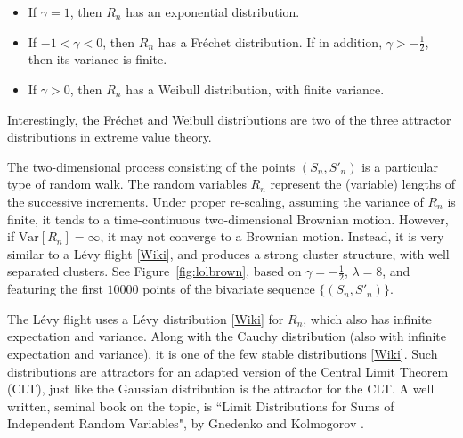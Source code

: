 \documentclass[oneside,10pt]{book}
\begin{document}
\begin{itemize}
\item If $\gamma=1$, then $R_n$ has an exponential distribution.
\item If $-1<\gamma<0$, then $R_n$ has a \textcolor{index}{Fréchet distribution}. If in addition, $\gamma>-\frac{1}{2}$, then its variance is finite. 
\item If $\gamma>0$, then $R_n$ has a \textcolor{index}{Weibull distribution}, with finite variance. 
\end{itemize}
Interestingly, the Fréchet and Weibull distributions are two of the three 
\textcolor{index}{attractor distributions} in \textcolor{index}{extreme value theory}.  

The two-dimensional process consisting of the points $(S_n,S'_n)$ is a particular type of random walk. The random variables $R_n$ represent the (variable) lengths of the successive increments. Under proper re-scaling, assuming the variance of $R_n$ is finite, it tends to a time-continuous
two-dimensional Brownian motion. However, if $\mbox{Var}[R_n]=\infty$, it may not converge to a Brownian motion. Instead, it is very similar to a 
\textcolor{index}{Lévy flight} [\href{https://en.wikipedia.org/wiki/L\%C3\%A9vy_flight}{Wiki}], and produces a strong cluster structure, with well separated clusters. See Figure~\ref{fig:lolbrown}, based on $\gamma=-\frac{1}{2}$, $\lambda=8$, and featuring the first $\num{10000}$ points
 of the bivariate sequence $\{(S_n,S'_n)\}$. 

The 
Lévy flight uses a \textcolor{index}{Lévy distribution}
[\href{https://bit.ly/3rV7mrq}{Wiki}] for $R_n$, which also has infinite expectation and variance. Along with 
the \textcolor{index}{Cauchy distribution} (also with infinite expectation and variance), it is one of the few \textcolor{index}{stable distributions} [\href{https://en.wikipedia.org/wiki/Stable_distribution}{Wiki}]. Such distributions are attractors 
for an adapted version of the \textcolor{index}{Central Limit Theorem} (CLT), just like the Gaussian distribution is the attractor
for the CLT. A well written, seminal book on the topic, is ``Limit Distributions for Sums of Independent Random Variables", by Gnedenko and Kolmogorov \cite{gk1954}.
\end{document}
